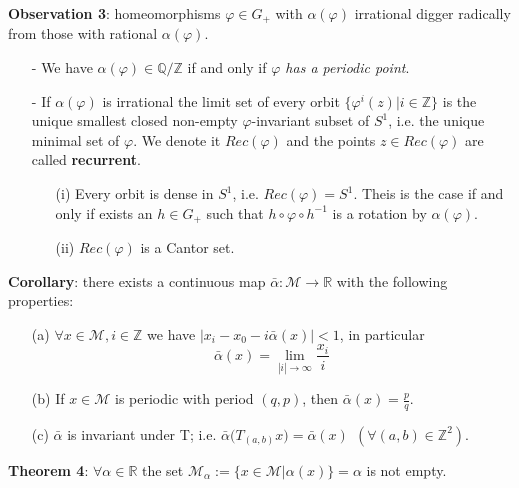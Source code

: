 \documentclass{article}
\begin{document}
\noindent \textbf{Observation 3}: homeomorphisms $\varphi \in G_{+}$ with $\alpha ( \varphi )$ irrational digger radically from those with rational $\alpha ( \varphi )$.
\begin{itemize}
	\item[-] We have $\alpha ( \varphi ) \in \mathbb{Q} / \mathbb{Z}$ if and only if \textit{$\varphi$ has a periodic point}.
	\item[-] If $\alpha ( \varphi )$ is irrational the limit set of every orbit $ \{ \varphi^{i} (z) | i \in \mathbb{Z} \}$ is the unique smallest closed non-empty $\varphi$-invariant subset of $S^{1}$, i.e. the unique minimal set of $\varphi$. We denote it $Rec(\varphi)$ and the points $z \in Rec(\varphi)$ are called \textbf{recurrent}.
	\begin{itemize}
		\item[(i)] Every orbit is dense in $S^{1}$, i.e. $Rec(\varphi) = S^1$. Theis is the case if and only if exists an $h \in G_{+}$ such that $h \circ \varphi \circ h^{-1}$ is a rotation by $\alpha ( \varphi)$.
		\item[(ii)] $Rec(\varphi)$ is a Cantor set.
	\end{itemize}
\end{itemize}


\noindent \textbf{Corollary}: there exists a continuous map $\bar{\alpha}: \mathcal{M} \rightarrow \mathbb{R}$ with the following properties:
	\begin{itemize}
		\item[(a)] $\forall x \in \mathcal{M}, i \in \mathbb{Z}$ we have $| x_{i} - x_{0} - i \bar{\alpha} ( x ) | < 1$, in particular 
			$$
				\bar{\alpha} (x) = \lim_{|i| \rightarrow \infty} \frac{x_i}{i}
			$$
		\item[(b)] If $x \in \mathcal{M}$ is periodic with period $(q, p)$, then $\bar{\alpha} (x) = \frac{p}{q}$.
		\item[(c)] $\bar{\alpha}$ is invariant under T; i.e. $\bar{\alpha} \big( T_{(a, b)} x \big) = \bar{\alpha} (x) \ \ (\forall (a, b) \in \mathbb{Z}^{2})$.
	\end{itemize}

\noindent \textbf{Theorem 4}: $\forall \alpha \in \mathbb{R}$ the set $\mathcal{M}_{\alpha} := \{ x \in \mathcal{M} | \alpha(x) \} = \alpha$ is not empty.
\end{document}
